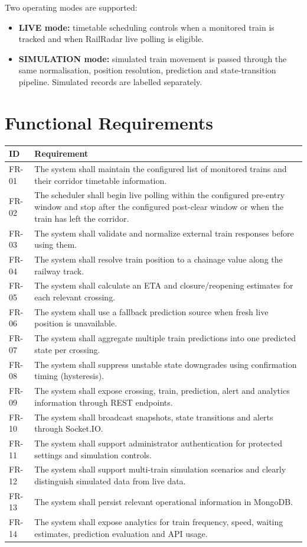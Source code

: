\documentclass[11pt,a4paper]{report}
\begin{document}
Two operating modes are supported:
\begin{itemize}
  \item \textbf{LIVE mode:} timetable scheduling controls when a monitored train is tracked and when RailRadar live polling is eligible.
  \item \textbf{SIMULATION mode:} simulated train movement is passed through the same normalisation, position resolution, prediction and state-transition pipeline. Simulated records are labelled separately.
\end{itemize}

\section{Functional Requirements}
\begin{longtable}{p{1.5cm}p{12.0cm}}
\toprule
\textbf{ID} & \textbf{Requirement}\\
\midrule
FR-01 & The system shall maintain the configured list of monitored trains and their corridor timetable information.\\
FR-02 & The scheduler shall begin live polling within the configured pre-entry window and stop after the configured post-clear window or when the train has left the corridor.\\
FR-03 & The system shall validate and normalize external train responses before using them.\\
FR-04 & The system shall resolve train position to a chainage value along the railway track.\\
FR-05 & The system shall calculate an ETA and closure/reopening estimates for each relevant crossing.\\
FR-06 & The system shall use a fallback prediction source when fresh live position is unavailable.\\
FR-07 & The system shall aggregate multiple train predictions into one predicted state per crossing.\\
FR-08 & The system shall suppress unstable state downgrades using confirmation timing (hysteresis).\\
FR-09 & The system shall expose crossing, train, prediction, alert and analytics information through REST endpoints.\\
FR-10 & The system shall broadcast snapshots, state transitions and alerts through Socket.IO.\\
FR-11 & The system shall support administrator authentication for protected settings and simulation controls.\\
FR-12 & The system shall support multi-train simulation scenarios and clearly distinguish simulated data from live data.\\
FR-13 & The system shall persist relevant operational information in MongoDB.\\
FR-14 & The system shall expose analytics for train frequency, speed, waiting estimates, prediction evaluation and API usage.\\
\bottomrule
\end{longtable}
\end{document}
